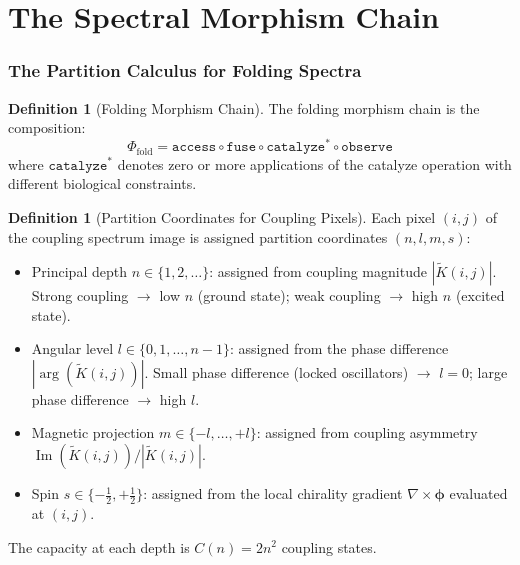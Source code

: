 \documentclass[11pt,twocolumn,a4paper]{article}
\theoremstyle{definition}
\newtheorem{definition}[theorem]{Definition}
\theoremstyle{remark}
\newcommand{\morphism}{\Phi}
\newcommand{\Ktilde}{\tilde{K}}
\begin{document}
\part{The Spectral Morphism Chain}

\section{The Partition Calculus for Folding Spectra}
\label{sec:partition_calculus}

\begin{definition}[Folding Morphism Chain]
\label{def:morphism_chain}
The folding morphism chain is the composition:
\begin{equation}
\label{eq:morphism_chain}
\morphism_{\text{fold}} = \texttt{access} \circ \texttt{fuse} \circ \texttt{catalyze}^* \circ \texttt{observe}
\end{equation}
where $\texttt{catalyze}^*$ denotes zero or more applications of the catalyze operation with different biological constraints.
\end{definition}

\begin{definition}[Partition Coordinates for Coupling Pixels]
\label{def:partition_coords}
Each pixel $(i, j)$ of the coupling spectrum image is assigned partition coordinates $(n, l, m, s)$:
\begin{itemize}
    \item Principal depth $n \in \{1, 2, \ldots\}$: assigned from coupling magnitude $|\Ktilde(i,j)|$. Strong coupling $\to$ low $n$ (ground state); weak coupling $\to$ high $n$ (excited state).
    \item Angular level $l \in \{0, 1, \ldots, n-1\}$: assigned from the phase difference $|\arg(\Ktilde(i,j))|$. Small phase difference (locked oscillators) $\to$ $l = 0$; large phase difference $\to$ high $l$.
    \item Magnetic projection $m \in \{-l, \ldots, +l\}$: assigned from coupling asymmetry $\operatorname{Im}(\Ktilde(i,j)) / |\Ktilde(i,j)|$.
    \item Spin $s \in \{-\tfrac{1}{2}, +\tfrac{1}{2}\}$: assigned from the local chirality gradient $\nabla \times \boldsymbol{\phi}$ evaluated at $(i, j)$.
\end{itemize}
The capacity at each depth is $C(n) = 2n^2$ coupling states.
\end{definition}
\end{document}
